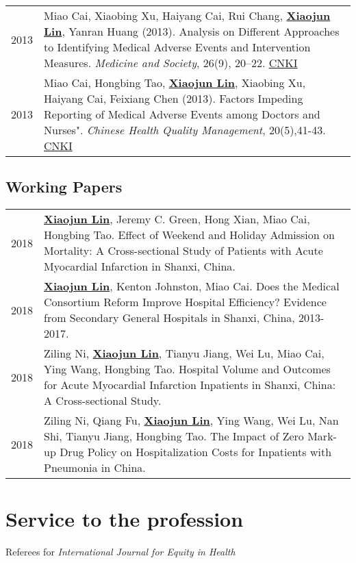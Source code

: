 \documentclass[a4paper,10pt]{article}
\begin{document}
\begin{longtable}{r p{13cm}}
2013 & Miao Cai, Xiaobing Xu, Haiyang Cai, Rui Chang, \underline{\textbf{Xiaojun Lin}}, Yanran Huang (2013). Analysis on Different Approaches to Identifying Medical Adverse Events and Intervention Measures. \emph{Medicine and Society}, 26(9), 20–22. \href{http://kns.cnki.net/KCMS/detail/detail.aspx?dbcode=CJFQ&dbname=CJFDHIS2&filename=YXSH201309007&v=MDAwNDFyQ1VSTEtlWnVac0Zpdm1XcnZOUERYWVpyRzRIOUxNcG85Rlk0UjhlWDFMdXhZUzdEaDFUM3FUcldNMUY=}{CNKI}\\
2013 & Miao Cai, Hongbing Tao, \underline{\textbf{Xiaojun Lin}}, Xiaobing Xu, Haiyang Cai, Feixiang Chen (2013). Factors Impeding Reporting of Medical Adverse Events among Doctors and Nurses". \emph{Chinese Health Quality Management}, 20(5),41-43. \href{http://kns.cnki.net/KCMS/detail/detail.aspx?dbcode=CJFQ&dbname=CJFDHIS2&filename=WSJG201305024&v=Mjc4MDIxTHV4WVM3RGgxVDNxVHJXTTFGckNVUkxLZVp1WnNGaXZuVXJ6Tk1qN0JhYkc0SDlMTXFvOUhZSVI4ZVg=}{CNKI}\\
\end{longtable}


\subsection*{Working Papers}
\begin{longtable}{r p{13cm}}
2018 & \underline{\textbf{Xiaojun Lin}}, Jeremy C. Green, Hong Xian, Miao Cai, Hongbing Tao. Effect of Weekend and Holiday Admission on Mortality: A Cross-sectional Study of Patients with Acute Myocardial Infarction in Shanxi, China.\\
2018 & \underline{\textbf{Xiaojun Lin}}, Kenton Johnston, Miao Cai. Does the Medical Consortium Reform Improve Hospital Efficiency? Evidence from Secondary General Hospitals in Shanxi, China, 2013-2017.\\
2018 & Ziling Ni, \underline{\textbf{Xiaojun Lin}}, Tianyu Jiang, Wei Lu, Miao Cai, Ying Wang, Hongbing Tao. Hospital Volume and Outcomes for Acute Myocardial Infarction Inpatients in Shanxi, China: A Cross-sectional Study.\\
2018 & Ziling Ni, Qiang Fu, \underline{\textbf{Xiaojun Lin}}, Ying Wang, Wei Lu, Nan Shi, Tianyu Jiang, Hongbing Tao. The Impact of Zero Mark-up Drug Policy on Hospitalization Costs for Inpatients with Pneumonia in China.\\
\end{longtable}


\section{Service to the profession}
Referees for \emph{International Journal for Equity in Health}
\end{document}
